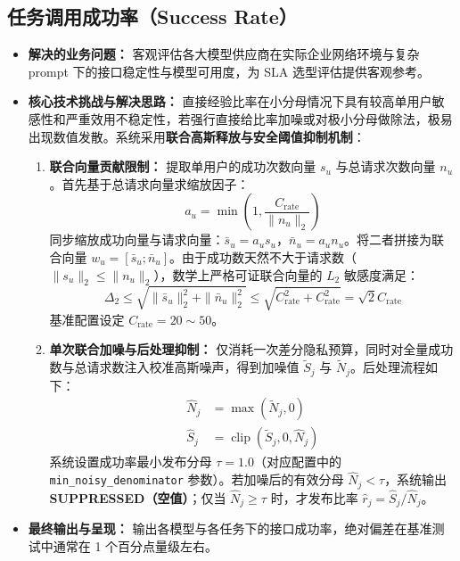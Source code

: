 \subsection{任务调用成功率（Success Rate）}
\begin{itemize}[leftmargin=2em]
  \item \textbf{解决的业务问题：} 客观评估各大模型供应商在实际企业网络环境与复杂 prompt 下的接口稳定性与模型可用度，为 SLA 选型评估提供客观参考。
  \item \textbf{核心技术挑战与解决思路：} 直接经验比率在小分母情况下具有较高单用户敏感性和严重效用不稳定性，若强行直接给比率加噪或对极小分母做除法，极易出现数值发散。系统采用\textbf{联合高斯释放与安全阈值抑制机制}：
  \begin{enumerate}[label=\arabic*., leftmargin=1.5em]
    \item \textbf{联合向量贡献限制：} 提取单用户的成功次数向量 $s_u$ 与总请求次数向量 $n_u$。首先基于总请求向量求缩放因子：
    \begin{equation}
      a_u = \min\left(1, \frac{C_{\text{rate}}}{\|n_u\|_2}\right)
    \end{equation}
    同步缩放成功向量与请求向量：$\bar{s}_u = a_u s_u$，$\bar{n}_u = a_u n_u$。将二者拼接为联合向量 $w_u = [\bar{s}_u ; \bar{n}_u]$。由于成功数天然不大于请求数（$\|s_u\|_2 \le \|n_u\|_2$），数学上严格可证联合向量的 $L_2$ 敏感度满足：
    \begin{equation}
      \Delta_2 \le \sqrt{\| \bar{s}_u \|_2^2 + \| \bar{n}_u \|_2^2} \le \sqrt{C_{\text{rate}}^2 + C_{\text{rate}}^2} = \sqrt{2} C_{\text{rate}}
    \end{equation}
    基准配置设定 $C_{\text{rate}} = 20 \sim 50$。
    \item \textbf{单次联合加噪与后处理抑制：} 仅消耗一次差分隐私预算，同时对全量成功数与总请求数注入校准高斯噪声，得到加噪值 $\tilde{S}_j$ 与 $\tilde{N}_j$。后处理流程如下：
    \begin{align}
      \hat{N}_j &= \max(\tilde{N}_j, 0) \\
      \hat{S}_j &= \operatorname{clip}(\tilde{S}_j, 0, \hat{N}_j)
    \end{align}
    系统设置成功率最小发布分母 $\tau = 1.0$（对应配置中的 \texttt{min\_noisy\_denominator} 参数）。若加噪后的有效分母 $\hat{N}_j < \tau$，系统输出 \textbf{SUPPRESSED（空值）}；仅当 $\hat{N}_j \ge \tau$ 时，才发布比率 $\hat{r}_j = \hat{S}_j / \hat{N}_j$。
  \end{enumerate}
  \item \textbf{最终输出与呈现：} 输出各模型与各任务下的接口成功率，绝对偏差在基准测试中通常在 1 个百分点量级左右。
\end{itemize}

